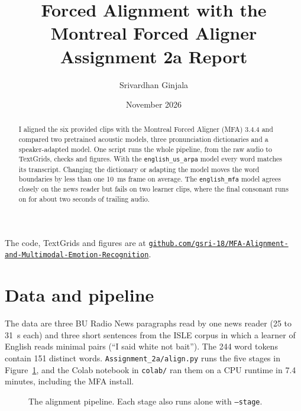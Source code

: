 \documentclass[11pt,a4paper]{article}
\title{\textbf{Forced Alignment with the Montreal Forced Aligner}\\[2pt]\large Assignment 2a Report}
\author{Srivardhan Ginjala}
\date{November 2026}
\newcommand{\code}[1]{\texttt{#1}}
\newcommand{\repo}{gsri-18/MFA-Alignment-and-Multimodal-Emotion-Recognition}
\begin{document}
\maketitle

\begin{center}\small
The code, TextGrids and figures are at \href{https://github.com/\repo}{\texttt{github.com/\repo}}.
\end{center}

\begin{abstract}
\noindent I aligned the six provided clips with the Montreal Forced Aligner (MFA) 3.4.4 and compared two pretrained
acoustic models, three pronunciation dictionaries and a speaker-adapted model. One script runs the whole pipeline,
from the raw audio to TextGrids, checks and figures. With the \code{english\_us\_arpa} model every word matches its
transcript. Changing the dictionary or adapting the model moves the word boundaries by less than one 10~ms frame on
average. The \code{english\_mfa} model agrees closely on the news reader but fails on two learner clips, where the
final consonant runs on for about two seconds of trailing audio.
\end{abstract}

\section{Data and pipeline}

The data are three BU Radio News paragraphs read by one news reader (25 to 31~s each) and three short sentences from
the ISLE corpus in which a learner of English reads minimal pairs (``I said white not bait''). The 244 word tokens
contain 151 distinct words. \code{Assignment\_2a/align.py} runs the five stages in Figure~\ref{fig:pipeline}, and the
Colab notebook in \code{colab/} ran them on a CPU runtime in 7.4 minutes, including the MFA install.

\begin{figure}[htbp]
\centering
{}
\caption{The alignment pipeline. Each stage also runs alone with \code{--stage}.}
\label{fig:pipeline}
\end{figure}
\end{document}

